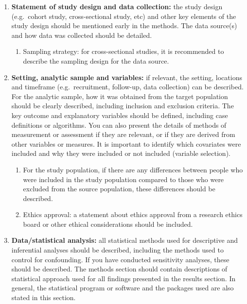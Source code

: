 \documentclass[
]{book}
\providecommand{\tightlist}{%
  \setlength{\itemsep}{0pt}\setlength{\parskip}{0pt}}
\begin{document}
\begin{enumerate}
\def\labelenumi{\arabic{enumi}.}
\item
  \textbf{Statement of study design and data collection:} the study design (e.g.~cohort study, cross-sectional study, etc) and other key elements of the study design should be mentioned early in the methods. The data source(s) and how data was collected should be detailed.

  \begin{enumerate}
  \def\labelenumii{\alph{enumii}.}
  \tightlist
  \item
    Sampling strategy: for cross-sectional studies, it is recommended to describe the sampling design for the data source.
  \end{enumerate}
\item
  \textbf{Setting, analytic sample and variables:} if relevant, the setting, locations and timeframe (e.g.~recruitment, follow-up, data collection) can be described. For the analytic sample, how it was obtained from the target population should be clearly described, including inclusion and exclusion criteria. The key outcome and explanatory variables should be defined, including case definitions or algorithms. You can also present the details of methods of measurement or assessment if they are relevant, or if they are derived from other variables or measures. It is important to identify which covariates were included and why they were included or not included (variable selection).

  \begin{enumerate}
  \def\labelenumii{\alph{enumii}.}
  \item
    For the study population, if there are any differences between people who were included in the study population compared to those who were excluded from the source population, these differences should be described.
  \item
    Ethics approval: a statement about ethics approval from a research ethics board or other ethical considerations should be included.
  \end{enumerate}
\item
  \textbf{Data/statistical analysis:} all statistical methods used for descriptive and inferential analyses should be described, including the methods used to control for confounding. If you have conducted sensitivity analyses, these should be described. The methods section should contain descriptions of statistical approach used for all findings presented in the results section. In general, the statistical program or software and the packages used are also stated in this section.
\end{enumerate}
\end{document}
